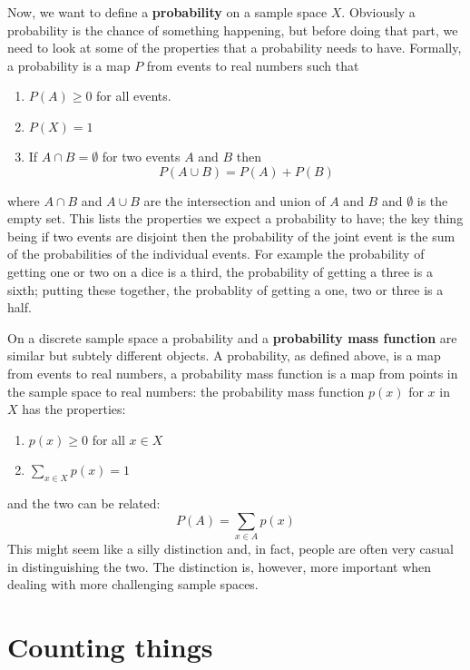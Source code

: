 \documentclass[11pt,a4paper]{scrartcl}
\begin{document}
Now, we want to define a \textbf{probability} on a sample space
$X$. Obviously a probability is the chance of something happening, but
before doing that part, we need to look at some of the properties that
a probability needs to have. Formally, a probability is a map $P$ from
events to real numbers such that
\begin{enumerate}
\item $P(A)\ge 0$ for all events.
\item $P(X)=1$
\item If $A\cap B=\emptyset$ for two events $A$ and $B$ then 
\begin{equation}
P(A\cup B)=P(A)+P(B)
\end{equation}
\end{enumerate}
where $A\cap B$ and $A\cup B$ are the intersection and union of $A$
and $B$ and $\emptyset$ is the empty set. This lists the properties we
expect a probability to have; the key thing being if two events are
disjoint then the probability of the joint event is the sum of the
probabilities of the individual events. For example the probability of
getting one or two on a dice is a third, the probability of getting a
three is a sixth; putting these together, the probablity of getting a
one, two or three is a half.


On a discrete sample space a probability and a \textbf{probability
  mass function} are similar but subtely different objects. A
probability, as defined above, is a map from events to real numbers, a
probability mass function is a map from points in the sample space to
real numbers: the probability mass function $p(x)$ for $x$ in $X$ has the properties:
\begin{enumerate}
\item $p(x)\ge 0$ for all $x\in X$
\item $\sum_{x\in X} p(x)=1$
\end{enumerate}
and the two can be related:
\begin{equation}
P(A)=\sum_{x\in A}p(x)
\end{equation}
This might seem like a silly distinction and, in fact, people are
often very casual in distinguishing the two. The distinction is,
however, more important when dealing with more challenging sample
spaces.

\section*{Counting things}
\end{document}
